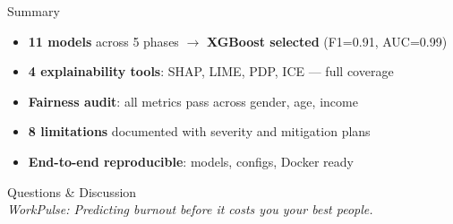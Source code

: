 \documentclass[aspectratio=169, 10pt]{beamer}
\newcommand{\cmark}{\checkmark}
\begin{document}
{
\begin{frame}{Summary}

\begin{itemize}\setlength\itemsep{8pt}
  \item[\textcolor{teal}{$\cmark$}] \textbf{11 models} across 5 phases $\rightarrow$ \textbf{XGBoost selected} (F1=0.91, AUC=0.99)
  \item[\textcolor{teal}{$\cmark$}] \textbf{4 explainability tools}: SHAP, LIME, PDP, ICE --- full coverage
  \item[\textcolor{teal}{$\cmark$}] \textbf{Fairness audit}: all metrics pass across gender, age, income
  \item[\textcolor{teal}{$\cmark$}] \textbf{8 limitations} documented with severity and mitigation plans
  \item[\textcolor{teal}{$\cmark$}] \textbf{End-to-end reproducible}: models, configs, Docker ready
\end{itemize}

\vspace{16pt}
\begin{center}
  {\Large\color{teal} Questions \& Discussion}\\[6pt]
  {\color{slate400}\textit{WorkPulse: Predicting burnout before it costs you your best people.}}
\end{center}

\end{frame}
}
\end{document}
